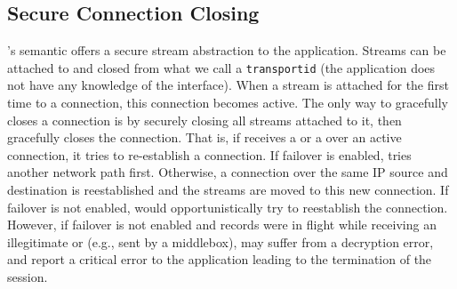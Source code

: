 \subsection{Secure Connection Closing}
\tcpls's semantic offers a secure stream abstraction to the application.
Streams can be attached to and closed from what we call a \texttt{transportid}
(the application does not have any knowledge of the \tcp interface). When a
stream is attached for the first time to a \tcp connection, this connection
becomes active. The only way to gracefully closes a \tcp connection is by
securely closing all streams attached to it, then \tcpls gracefully closes the
\tcp connection. That is, if \tcpls receives a \rst or a \fin over an active
\tcp connection, it tries to re-establish a \tcp connection. If failover is
enabled, \tcpls tries another network path first. Otherwise, a connection over
the same IP source and destination is reestablished and the streams are moved to
this new \tcp connection. If failover is not enabled, \tcpls would
opportunistically try to reestablish the connection. However, if failover is not
enabled and records were in flight while receiving an illegitimate \rst or \fin
(e.g., sent by a middlebox), \tcpls may suffer from a decryption error, and
report a critical error to the application leading to the termination of the
session.
